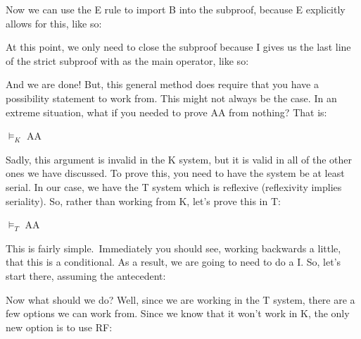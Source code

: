 Now we can use the \ebox E rule to import B into the subproof, because \ebox E explicitly allows for this, like so: 

\begin{fitchproof}
\open
{}
\end{fitchproof}

At this point, we only need to close the subproof because \ediamond I gives us the last line of the strict subproof with \ediamond  as the main operator, like so:

\begin{fitchproof}
\open
{}
\close
{}
\end{fitchproof}

And we are done! But, this general method does require that you have a possibility statement to work from. This might not always be the case. In an extreme situation, what if you needed to prove \ebox A\eif \ediamond A from nothing? That is:
\begin{center}
$\vDash_K$ \ebox A\eif \ediamond A
\end{center}
Sadly, this argument is invalid in the K system, but it is valid in all of the other ones we have discussed. To prove this, you need to have the system be at least serial. In our case, we have the T system which is reflexive (reflexivity implies seriality). So, rather than working from K, let's prove this in T:
\begin{center}
$\vDash_T$ \ebox A\eif \ediamond A
\end{center}
This is fairly simple. Immediately you should see, working backwards a little, that this is a conditional. As a result, we are going to need to do a \eif I. So, let's start there, assuming the antecedent:
\begin{fitchproof}
\open
{}
\end{fitchproof}

Now what should we do? Well, since we are working in the T system, there are a few options we can work from. Since we know that it won't work in K, the only new option is to use RF: 
\begin{fitchproof}
\open
{}
\end{fitchproof}

